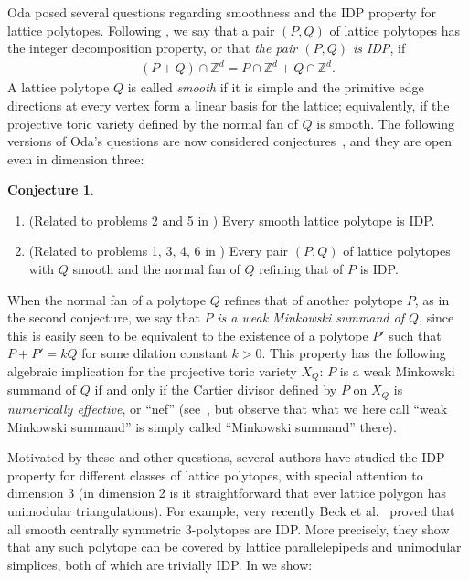 \documentclass{amsart}
\theoremstyle{plain}
\theoremstyle{definition}
\newtheorem{conjecture}[theorem]{Conjecture}
\newcommand{\Z}{ \ensuremath{\mathbb{Z}}}
\newcommand{\paco}[1]{\todo[size=\tiny,color=green!30]{#1 \\ \hfill --- P.}}
\begin{document}
Oda \cite{Oda1997} posed several questions regarding smoothness and the IDP property for lattice polytopes.
%
Following \cite{HaaseHof, Tsuchiya}, we say that a pair $(P, Q)$ of lattice polytopes has the integer decomposition property, or that \emph{the pair $(P,Q)$ is IDP}, if 
\begin{align*}
\label{eq:mixedIDP}
(P+Q) \cap \Z^d = P \cap \Z^d + Q \cap \Z^d.
\end{align*}
%
A lattice polytope $Q$ is called \emph{smooth} if it is simple and the primitive edge directions at every vertex form a linear basis for the lattice; equivalently, if the projective toric variety defined by the normal fan of $Q$ is smooth. 
The following versions of Oda's questions are now considered conjectures~\cite{HNPS2008,mfo2007}, and they are open even in dimension three:
\begin{conjecture}
\label{conj:Oda}
\begin{enumerate}
\item 
\label{itm:smoothIDP}
(Related to problems 2 and 5 in \cite{Oda1997})
Every smooth lattice polytope is IDP.
\item 
\label{itm:mixedIDP}
(Related to problems 1, 3, 4, 6 in \cite{Oda1997}) Every pair $(P,Q)$ of lattice polytopes with $Q$ smooth and the normal fan of $Q$ refining that of $P$ is IDP.
\end{enumerate}
\end{conjecture}

When the normal fan of a polytope $Q$ refines that of another polytope $P$, as in the second conjecture, we say that $P$ \emph{is a weak Minkowski summand of $Q$}, since this is easily seen to be equivalent to the existence of a polytope $P'$ such that $P+P' = k Q$ for some dilation constant $k>0$.
This property has the following algebraic implication for the projective toric variety $X_Q$: $P$ is a weak Minkowski summand of $Q$ if and only if the Cartier divisor defined by $P$ on  $X_Q$ is \emph{numerically effective}, or ``nef'' (see~\cite[Cor.~6.2.15, Prop.~6.3.12]{CLS}, but observe that what we here call  ``weak Minkowski summand'' is simply called ``Minkowski summand'' there). 


\medskip 
Motivated by these and other questions, several authors have studied the IDP property for different classes of lattice polytopes,
with special attention to dimension $3$ (in dimension 2 is it straightforward that ever lattice polygon has unimodular triangulations). 
%
For example,  very recently
Beck et al.~\cite{BHHHJKM2019} proved that all smooth centrally symmetric $3$-polytopes are IDP.
More precisely, they show that any such polytope can be covered by lattice 
parallelepipeds and unimodular simplices, both of which are trivially IDP.
%
In  we show:
\end{document}
